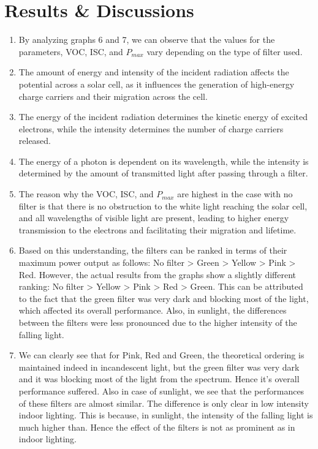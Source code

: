 \section{Results \& Discussions}
	\begin{enumerate}
		\item By analyzing graphs 6 and 7, we can observe that the values for the parameters, VOC, ISC, and $P_{max}$ vary depending on the type of filter used.

		\item The amount of energy and intensity of the incident radiation affects the potential across a solar cell, as it influences the generation of high-energy charge carriers and their migration across the cell.

		\item The energy of the incident radiation determines the kinetic energy of excited electrons, while the intensity determines the number of charge carriers released.

		\item The energy of a photon is dependent on its wavelength, while the intensity is determined by the amount of transmitted light after passing through a filter.

		\item The reason why the VOC, ISC, and $P_{max}$ are highest in the case with no filter is that there is no obstruction to the white light reaching the solar cell, and all wavelengths of visible light are present, leading to higher energy transmission to the electrons and facilitating their migration and lifetime.

		\item Based on this understanding, the filters can be ranked in terms of their maximum power output as follows: No filter > Green > Yellow > Pink > Red. However, the actual results from the graphs show a slightly different ranking: No filter > Yellow > Pink > Red > Green. This can be attributed to the fact that the green filter was very dark and blocking most of the light, which affected its overall performance. Also, in sunlight, the differences between the filters were less pronounced due to the higher intensity of the falling light.
		
		\item We can clearly see that for Pink, Red and Green, the theoretical ordering is maintained indeed in incandescent light, but the green filter was very dark and it was blocking most of the light from the spectrum. Hence it's overall performance suffered. Also in case of sunlight, we see that the performances of these filters are almost similar. The difference is only clear in low intensity indoor lighting. This is because, in sunlight, the intensity of the falling light is much higher than. Hence the effect of the filters is not as prominent as in indoor lighting.


\end{enumerate}
